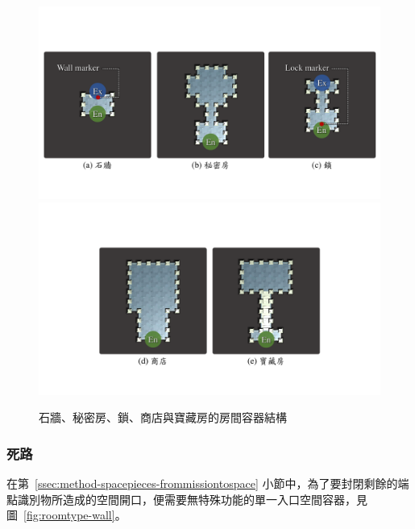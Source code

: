 \begin{figure}[!htb]
  \begin{center}
    \includegraphics[width=1.0\textwidth]{figures/roomtype-special.pdf}
    \includegraphics[width=1.0\textwidth]{figures/roomtype-special-.pdf}
    \caption{石牆、秘密房、鎖、商店與寶藏房的房間容器結構}
    \label{fig:roomtype-special}
  \end{center}
\end{figure}

\subsubsection{死路}
\label{sssec:method-spacepieces-types-wall}

在第~\ref{ssec:method-spacepieces-frommissiontospace} 小節中，為了要封閉剩餘的端點識別物所造成的空間開口，便需要無特殊功能的單一入口空間容器，見圖~\ref{fig:roomtype-wall}。

